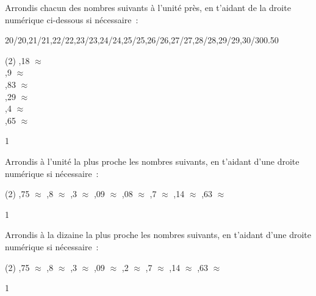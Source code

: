 \documentclass[a4paper,11pt]{report}
\begin{document}
\begin{exop}
{Arrondis chacun des nombres suivants à l'unité près, en t'aidant de la droite numérique ci-dessous si nécessaire~:
\begin{center}
\vspace*{0.1cm}
\begin{numberlined}{20}{30}{1}{0.1}{20/20,21/21,22/22,23/23,24/24,25/25,26/26,27/27,28/28,29/29,30/30}{0.5}{0}{}\end{numberlined}
\vspace*{0.1cm}
\end{center}
\begin{tasks}[after-item-skip = 0em, after-skip=-2em](2)
,18 $\approx$ \hrulefill \\
,9 $\approx$ \hrulefill \\
,83 $\approx$ \hrulefill \\
,29 $\approx$ \hrulefill \\
,4 $\approx$ \hrulefill \\
,65 $\approx$ \hrulefill \\
\end{tasks}
}{1}
\end{exop}


\begin{exop}{
Arrondis à l'unité la plus proche les nombres suivants, en t'aidant d'une droite numérique si nécessaire~:
\begin{tasks}[after-item-skip = 0.12em, after-skip=-1.5em](2)
\bigskip{},75 $\approx$\hrulefill 
\bigskip{},8 $\approx$ \hrulefill 
\bigskip{},3 $\approx$ \hrulefill 
\bigskip{},09 $\approx$\hrulefill 
\bigskip{},08 $\approx$\hrulefill 
\bigskip{},7 $\approx$\hrulefill 
\bigskip{},14 $\approx$\hrulefill 
\bigskip{},63 $\approx$ \hrulefill 
\end{tasks}

}{1}\end{exop}

\begin{exop}{
Arrondis à la dizaine  la plus proche les nombres suivants, en t'aidant d'une droite numérique si nécessaire~:
\begin{tasks}[after-item-skip = 0.2em, after-skip=-1.5em](2)
\bigskip{},75 $\approx$ \hrulefill 
\bigskip{},8 $\approx$ \hrulefill 
\bigskip{},3 $\approx$ \hrulefill 
\bigskip{},09 $\approx$ \hrulefill 
\bigskip{},2 $\approx$ \hrulefill 
\bigskip{},7 $\approx$ \hrulefill 
\bigskip{},14 $\approx$\hrulefill 
\bigskip{},63 $\approx$\hrulefill 
\end{tasks}
}{1}\end{exop}
\end{document}

